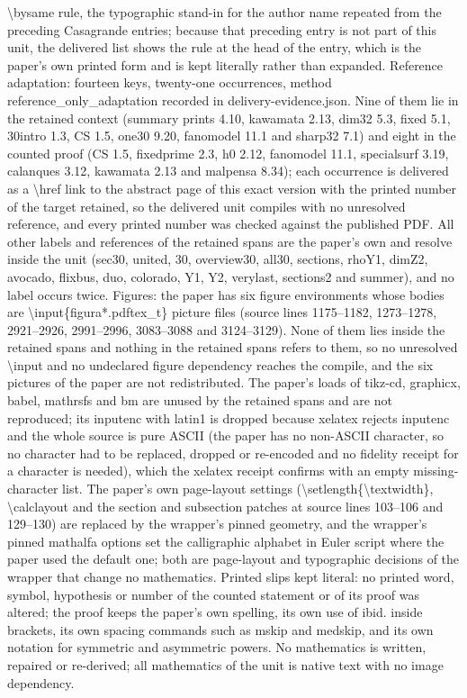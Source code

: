 \documentclass[10pt,a4paper]{amsart}
\theoremstyle{definition}
\numberwithin{figure}{section}
\numberwithin{table}{section}
\begin{document}
\textbackslash{}bysame rule, the typographic stand-in for the author name repeated from the preceding Casagrande entries; because that preceding entry is not part of this unit, the delivered list shows the rule at the head of the entry, which is the paper's own printed form and is kept literally rather than expanded. Reference adaptation: fourteen keys, twenty-one occurrences, method reference\_only\_adaptation recorded in delivery-evidence.json. Nine of them lie in the retained context (summary prints 4.10, kawamata 2.13, dim32 5.3, fixed 5.1, 30intro 1.3, CS 1.5, one30 9.20, fanomodel 11.1 and sharp32 7.1) and eight in the counted proof (CS 1.5, fixedprime 2.3, h0 2.12, fanomodel 11.1, specialsurf 3.19, calanques 3.12, kawamata 2.13 and malpensa 8.34); each occurrence is delivered as a \textbackslash{}href link to the abstract page of this exact version with the printed number of the target retained, so the delivered unit compiles with no unresolved reference, and every printed number was checked against the published PDF. All other labels and references of the retained spans are the paper's own and resolve inside the unit (sec30, united, 30, overview30, all30, sections, rhoY1, dimZ2, avocado, flixbus, duo, colorado, Y1, Y2, verylast, sections2 and summer), and no label occurs twice. Figures: the paper has six figure environments whose bodies are \textbackslash{}input\{figura*.pdftex\_t\} picture files (source lines 1175--1182, 1273--1278, 2921--2926, 2991--2996, 3083--3088 and 3124--3129). None of them lies inside the retained spans and nothing in the retained spans refers to them, so no unresolved \textbackslash{}input and no undeclared figure dependency reaches the compile, and the six pictures of the paper are not redistributed. The paper's loads of tikz-cd, graphicx, babel, mathrsfs and bm are unused by the retained spans and are not reproduced; its inputenc with latin1 is dropped because xelatex rejects inputenc and the whole source is pure ASCII (the paper has no non-ASCII character, so no character had to be replaced, dropped or re-encoded and no fidelity receipt for a character is needed), which the xelatex receipt confirms with an empty missing-character list. The paper's own page-layout settings (\textbackslash{}setlength\{\textbackslash{}textwidth\}, \textbackslash{}calclayout and the section and subsection patches at source lines 103--106 and 129--130) are replaced by the wrapper's pinned geometry, and the wrapper's pinned mathalfa options set the calligraphic alphabet in Euler script where the paper used the default one; both are page-layout and typographic decisions of the wrapper that change no mathematics. Printed slips kept literal: no printed word, symbol, hypothesis or number of the counted statement or of its proof was altered; the proof keeps the paper's own spelling, its own use of ibid. inside brackets, its own spacing commands such as mskip and medskip, and its own notation for symmetric and asymmetric powers. No mathematics is written, repaired or re-derived; all mathematics of the unit is native text with no image dependency.
\setcounter{section}{8}
\end{document}
